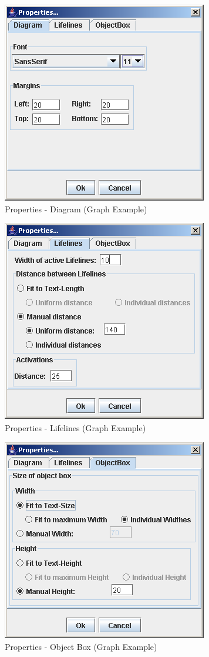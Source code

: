 \documentclass[a4paper,titlepage,oneside,final]{scrreprt} %
\begin{document}
\begin{figure}[ht]
\centering
\includegraphics[scale=0.7]{Screenshots/GUI/Views/SeqDiagPropertiesDiagram.png}
\caption{Properties - Diagram (Graph Example)}
\label{fig:SeqDiagPropertiesDiagram}
\end{figure}
\begin{figure}[ht]
\centering
\includegraphics[scale=0.7]{Screenshots/GUI/Views/SeqDiagPropertiesLifelines.png}
\caption{Properties - Lifelines (Graph Example)}
\label{fig:SeqDiagPropertiesLifelines}
\end{figure}
\begin{figure}[ht]
\centering
\includegraphics[scale=0.7]{Screenshots/GUI/Views/SeqDiagPropertiesObjectBox.png}
\caption{Properties - Object Box (Graph Example)}
\label{fig:SeqDiagPropertiesObjectBox}
\end{figure}
\end{document}
